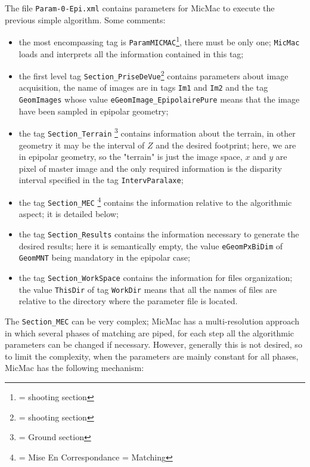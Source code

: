 The file {\tt Param-0-Epi.xml} contains parameters for MicMac  to execute
the previous simple algorithm. Some comments:

\begin{itemize}
   \item  the most encompassing tag is {\tt ParamMICMAC}\footnote{= shooting section },
       there must be only one;
          {\tt MicMac} loads and interprets all the information contained in this tag;

   \item the first level tag {\tt Section\_PriseDeVue}\footnote{= shooting section }
         contains parameters about
         image acquisition,  the name of images are in tags
         {\tt Im1} and {\tt Im2} and the tag {\tt GeomImages} whose value
         {\tt eGeomImage\_EpipolairePure} means that the image have been sampled
         in epipolar geometry;

    \item the tag {\tt Section\_Terrain} \footnote{= Ground section} contains information
          about the terrain, in other geometry it may be the interval of $Z$ and the desired
          footprint; here, we are in epipolar geometry, so the "terrain" is just the image space,
          $x$ and $y$ are pixel of master image and the only required information  is the disparity
           interval specified in the tag {\tt IntervParalaxe};


    \item the tag {\tt Section\_MEC} \footnote{= Mise En Correspondance = Matching} contains the
          information relative to the algorithmic aspect; it is detailed below;

    \item  the tag {\tt Section\_Results} contains the information necessary to generate the  desired results; here it is semantically
           empty, the value {\tt eGeomPxBiDim} of {\tt GeomMNT} being mandatory in the epipolar case;

    \item the tag {\tt Section\_WorkSpace} contains the information for files organization;
           the value {\tt ThisDir} of tag {\tt WorkDir} means that all the names of files are
           relative to the directory where the parameter file is located.

\end{itemize}


The  {\tt Section\_MEC} can be very complex; MicMac has a multi-resolution approach in which
several phases of matching are piped, for each step all the algorithmic parameters can be changed if necessary.
However, generally this is not desired, so to limit the complexity,
when the parameters are mainly constant for all phases, MicMac has the following mechanism:


